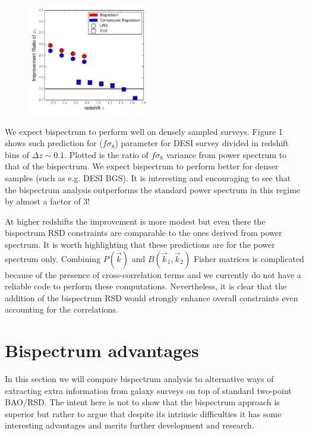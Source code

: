 \begin{figure}
\begin{center}
\includegraphics[width=0.48\textwidth]{fz.pdf}
\end{center}
\end{figure}
We expect bispectrum to perform well on densely sampled surveys. Figure 1 shows
such prediction for ($f\sigma_8$) parameter for DESI survey divided in redshift
bins of $\Delta z \sim 0.1$. Plotted is the ratio of $f\sigma_8$ variance from
power spectrum to that of the bispectrum. We expect bispectrum to perform
better for denser samples (such as e.g. DESI BGS). It is interesting and
encouraging to see that the bispectrum analysis outperforms the standard power
spectrum in this regime by almost a factor of 3!

At higher redshifts the improvement is more modest but even there the
bispectrum RSD constraints are comparable to the ones derived from power
spectrum. It is worth highlighting that these predictions are for the power
spectrum only. Combining $P(\vec{k})$ and $B(\vec{k}_1,\vec{k}_2)$ Fisher
matrices is complicated because of the presence of cross-correlation terms and
we currently do not have a reliable code to perform these computations.
Nevertheless, it is clear that the addition of the bispectrum RSD would
strongly enhance overall constraints even accounting for the correlations.

\section{Bispectrum advantages}

In this section we will compare bispectrum analysis to alternative ways of
extracting extra information from galaxy surveys on top of standard two-point
BAO/RSD. The intent here is not to show that the bispectrum approach is
superior but rather to argue that despite its intrinsic difficulties it has
some interesting advantages and merits further development and research.

